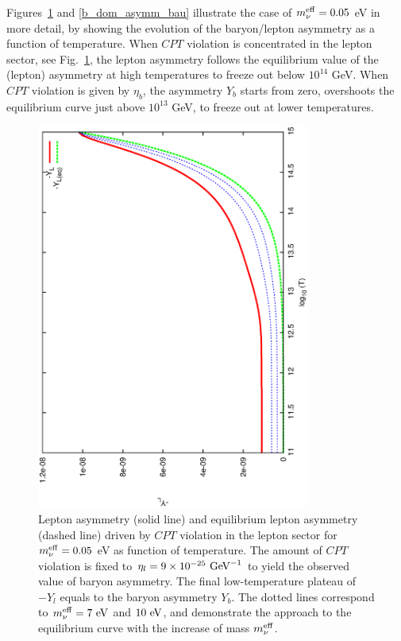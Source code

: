 \documentclass[12pt]{revtex4}
\newcommand{\meff}{m^{\rm eff}_\nu}
\newcommand{\GeV}{{\rm GeV}}
\newcommand{\eV}{{\rm eV}}
\begin{document}
	Figures~\ref{l_dom_asymm_bau} and \ref{b_dom_asymm_bau} illustrate the 
	case of $\meff=0.05$ eV in more detail, by showing the evolution of the baryon/lepton
	asymmetry as a function of temperature. When $CPT$ violation is concentrated in the 
lepton sector, see Fig.~\ref{l_dom_asymm_bau}, the lepton asymmetry follows the 
equilibrium value of the (lepton)
	asymmetry at high temperatures to freeze out below $10^{14}$ GeV.
When $CPT$ violation is given by $\eta_b$, the asymmetry $ Y_b $ starts from zero, 
    overshoots the equilibrium curve just above $10^{13}$ GeV, to freeze out
	at lower temperatures. 


\begin{figure}
\includegraphics[width=9cm,angle=270]{l_dom_asymm_bau.ps}
\caption{
	Lepton asymmetry (solid line) and equilibrium lepton asymmetry (dashed line) 
driven by $CPT$ violation in the lepton sector
    for $\meff=0.05$ eV as function of temperature.
	The amount of $CPT$ violation is fixed to $ \eta_l = 9 \times 10^{-25}~\GeV^{-1} $ 
	to yield the observed value of baryon asymmetry.
	The final low-temperature plateau of $-Y_l$ equals to the baryon asymmetry $Y_b$. 
	The dotted lines correspond to $ \meff = 7~\eV $ and $ 10~\eV $, and 
	demonstrate the approach to the equilibrium curve with the increase 
	of mass $ \meff $.
	}
\label{l_dom_asymm_bau}
\end{figure}
\end{document}
